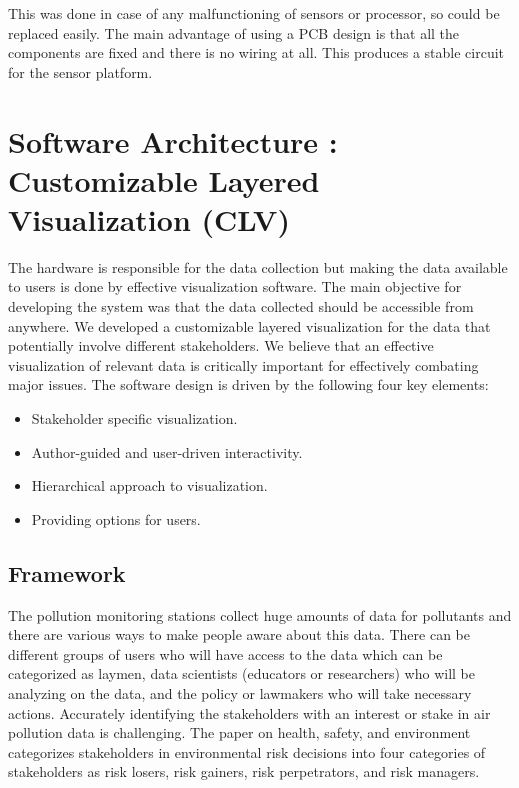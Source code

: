  This was done in case of any malfunctioning of sensors or processor, so could be replaced easily. The main advantage of using a PCB design is that all the components are fixed and there is no wiring at all. This produces a stable circuit for the sensor platform.

\section{Software Architecture : Customizable Layered Visualization (CLV)}

The hardware is responsible for the data collection but making the data available to users is done by effective visualization software. The main objective for developing the system was that the data collected should be accessible from anywhere. We developed a customizable layered visualization for the data that potentially involve different stakeholders. We believe that an effective visualization of relevant data is critically important for effectively combating major issues. The software design is driven by the following four key elements:

\begin{itemize}

\item Stakeholder specific  visualization.

\item Author-guided and user-driven interactivity.

\item Hierarchical approach to visualization.

\item Providing options for users.

\end{itemize}



\subsection{Framework}

The pollution monitoring stations collect huge amounts of data for pollutants and there are various ways to make people aware about this data. There can be different groups of users who will have access to the data which can be categorized as laymen, data scientists (educators or researchers) who will be analyzing on the data, and the policy or lawmakers who will take necessary actions. Accurately identifying the stakeholders with an interest or stake in air pollution data is challenging. The paper on health, safety, and environment  \cite{English2000} categorizes stakeholders in environmental risk decisions into four categories of stakeholders as risk losers, risk gainers, risk perpetrators, and risk managers. 


